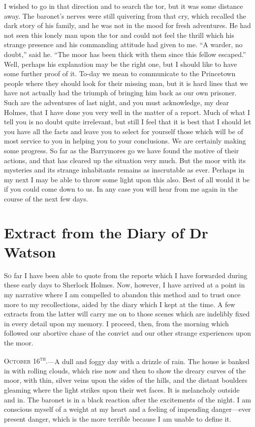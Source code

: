 \documentclass[paper=5.5in:8.5in,BCOR=7mm,twoside,DIV=calc,12pt,usegeometry,openany,chapterprefix,endperiod]{scrbook} %
\begin{document}
I wished to go in that direction and to search the tor, but it was some distance away. The baronet's nerves were still quivering from that cry, which recalled the dark story of his family, and he was not in the mood for fresh adventures. He had not seen this lonely man upon the tor and could not feel the thrill which his strange presence and his commanding attitude had given to me. \enquote{A warder, no doubt,} said he. \enquote{The moor has been thick with them since this fellow escaped.} Well, perhaps his explanation may be the right one, but I should like to have some further proof of it. To-day we mean to communicate to the Princetown people where they should look for their missing man, but it is hard lines that we have not actually had the triumph of bringing him back as our own prisoner. Such are the adventures of last night, and you must acknowledge, my dear Holmes, that I have done you very well in the matter of a report. Much of what I tell you is no doubt quite irrelevant, but still I feel that it is best that I should let you have all the facts and leave you to select for yourself those which will be of most service to you in helping you to your conclusions. We are certainly making some progress. So far as the Barrymores go we have found the motive of their actions, and that has cleared up the situation very much. But the moor with its mysteries and its strange inhabitants remains as inscrutable as ever. Perhaps in my next I may be able to throw some light upon this also. Best of all would it be if you could come down to us. In any case you will hear from me again in the course of the next few days.

\chapter{Extract from the Diary of Dr Watson}
\lettrine[lines=1]{S}{o} far I have been able to quote from the reports which I have forwarded during these early days to Sherlock Holmes. Now, however, I have arrived at a point in my narrative where I am compelled to abandon this method and to trust once more to my recollections, aided by the diary which I kept at the time. A few extracts from the latter will carry me on to those scenes which are indelibly fixed in every detail upon my memory. I proceed, then, from the morning which followed our abortive chase of the convict and our other strange experiences upon the moor.
\vfill

\textsc{October 16\textsuperscript{th}.}\nobreakdash---A dull and foggy day with a drizzle of rain. The house is banked in with rolling clouds, which rise now and then to show the dreary curves of the moor, with thin, silver veins upon the sides of the hills, and the distant boulders gleaming where the light strikes upon their wet faces. It is melancholy outside and in. The baronet is in a black reaction after the excitements of the night. I am conscious myself of a weight at my heart and a feeling of impending danger\nobreakdash---ever present danger, which is the more terrible because I am unable to define it.
\end{document}
